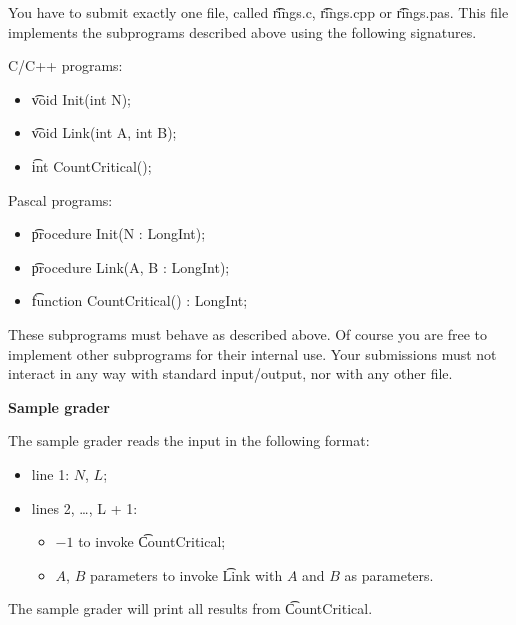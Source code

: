 You have to submit exactly one file, called \t{rings.c}, \t{rings.cpp} or \t{rings.pas}. This file implements the subprograms described above using the following signatures.

C/C++ programs:

\begin{itemize}
\item \t{void Init(int N);}
\item \t{void Link(int A, int B);}
\item \t{int CountCritical();}
\end{itemize}

Pascal programs:

\begin{itemize}
\item \t{procedure Init(N : LongInt);}
\item \t{procedure Link(A, B : LongInt);}
\item \t{function CountCritical() : LongInt;}
\end{itemize}
These subprograms must behave as described above. Of course you are free to implement other subprograms for their internal use. Your submissions must not interact in any way with standard input/output, nor with any other file.


\bf{Sample grader}

The sample grader reads the input in the following format:
\begin{itemize}
\item line 1: $N$, $L$;
\item lines 2, \dots, L + 1:
\begin{itemize}
\item $-1$ to invoke \t{CountCritical};
\item $A$, $B$ parameters to invoke \t{Link} with $A$ and $B$ as parameters.
\end{itemize} \end{itemize}
The sample grader will print all results from \t{CountCritical}.